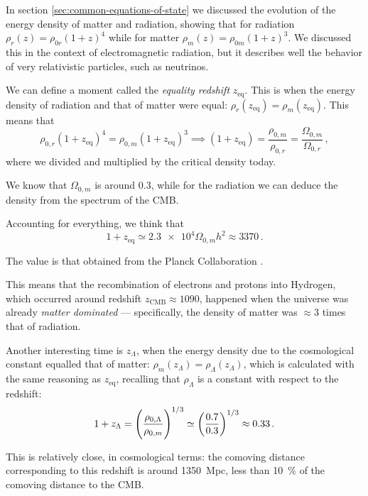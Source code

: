 \documentclass[main.tex]{subfiles}
\begin{document}
In section \ref{sec:common-equations-of-state} we discussed the evolution of the energy density of matter and radiation, showing that for radiation \(\rho _r (z ) = \rho _{0r} (1+z)^{4}\) while for matter
\(\rho _m (z) = \rho_{0m} (1+z)^{3}\). 
We discussed this in the context of electromagnetic radiation, but it describes well the behavior of very relativistic particles, such as neutrinos. 

We can define a moment called the \emph{equality redshift} \(z _{\text{eq}}\).
This is when the energy density of radiation and that of matter were equal: \(\rho _r (z _{\text{eq}}) = \rho _m (z _{\text{eq}})\).
This means that 
%
\begin{equation}
\rho_{0,r} (1+z _{\text{eq}})^{4} = \rho_{0,m} (1+z _{\text{eq}})^{3} \implies
(1+z _{\text{eq}}) = \frac{\rho _{0,m}}{\rho _{0,r}} 
  = \frac{\Omega_{0,m}}{\Omega_{0,r}}
\,,
\end{equation}
%
where we divided and multiplied by the critical density today. 

We know that \(\Omega_{0,m}\) is around \num{0.3}, while for the radiation we can deduce the density from the spectrum of the CMB.

Accounting for everything, we think that 
%
\begin{equation}
  1 + z _{\text{eq}} \simeq \num{2.3e4} \Omega_{0, m} h^2
  \approx 3370
\,.
\end{equation}

The value is that obtained from the Planck Collaboration \cite[]{adePlanck2015Results2016}.

This means that the recombination of electrons and protons into Hydrogen, which occurred around redshift \(z _{\text{CMB}} \approx 1090\), happened when the universe was already \emph{matter dominated} --- specifically, the density of matter was \(\approx 3\) times that of radiation.

Another interesting time is \(z_\Lambda \), when the energy density due to the cosmological constant equalled that of matter:  \(\rho _m (z_{\Lambda }) = \rho _\Lambda (z_\Lambda )\), which is calculated with the same reasoning as \(z _{\text{eq}}\), recalling that \(\rho_{\Lambda }\) is a constant with respect to the redshift:
\begin{equation}
1+ z_\Lambda = \qty(\frac{\rho_{0, \Lambda }}{\rho_{0,m}})^{1/3} \simeq \qty(\frac{0.7}{0.3})^{1/3} \approx \num{0.33}
\,.
\end{equation}

This is relatively close, in cosmological terms: the comoving distance corresponding to this redshift is around \SI{1350}{Mpc}, less than \SI{10}{\percent} of the comoving distance to the CMB. 
\end{document}
